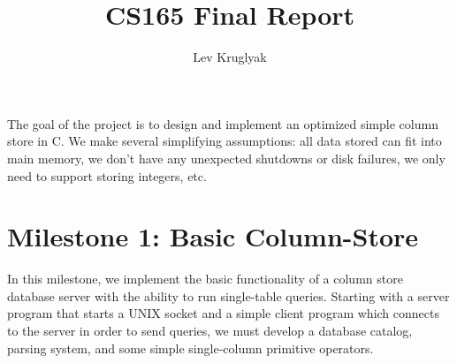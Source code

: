 \documentclass[a4paper, 12pt]{article}
\begin{document}
\linespread{0.5}

\title{CS165 Final Report}

\author{Lev Kruglyak}


\maketitle 
\thispagestyle{fancy} 
\pagestyle{fancy}

The goal of the project is to design and implement an optimized simple column store in C. We make several simplifying assumptions: all data stored can fit into main memory, we don't have any unexpected shutdowns or disk failures, we only need to support storing integers, etc.

\section{Milestone 1: Basic Column-Store}

In this milestone, we implement the basic functionality of a column store database server with the ability to run single-table queries. Starting with a server program that starts a UNIX socket and a simple client program which connects to the server in order to send queries, we must develop a database catalog, parsing system, and some simple single-column primitive operators.
\end{document}
